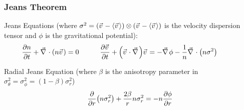 		\subsubsection{Jeans Theorem}
			Jeans Equations (where $\sigma^2 = \qty(\vec{v}-\avg{\vec{v}})\otimes\qty(\vec{v}-\avg{\vec{v}})$ is the velocity dispersion tensor and $\phi$ is the gravitational potential):
			\begin{equation}
				\pdv{n}{t} + \Nabla\cdot\qty(n\vec{v}) = 0 \hsp
				\pdv{\vec{v}}{t} + \qty(\vec{v}\cdot\Nabla)\vec{v} = -\Nabla\phi -\frac{1}{n}\Nabla\cdot\qty(n\sigma^2) \hsp
			\end{equation}

			\noindent
			Radial Jeans Equation (where $\beta$ is the anisotropy parameter in $\sigma_\theta^2 = \sigma_\phi^2 = (1-\beta) \sigma_r^2$)
			\begin{equation}
				\pdv{r} \qty(n\sigma_r^2) + \frac{2\beta}{r} n\sigma_r^2 = -n\pdv{\phi}{r}
			\end{equation}
